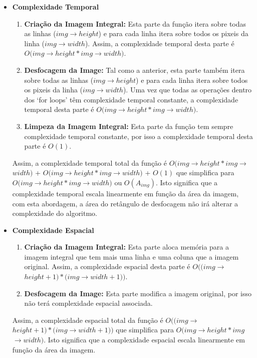 \begin{itemize}
    
\item
\textbf{Complexidade Temporal}

\begin{enumerate}
    \item \textbf{Criação da Imagem Integral:} Esta parte da função itera sobre todas as linhas ($img$$\rightarrow$$height$) e para cada linha itera sobre todos os pixeis da linha ($img$$\rightarrow$$width$). Assim, a complexidade temporal desta parte é $O(img$$\rightarrow$$height * img$$\rightarrow$$width)$.
    \item \textbf{Desfocagem da Image:} Tal como a anterior, esta parte também itera sobre todas as linhas ($img$$\rightarrow$$height$) e para cada linha itera sobre todos os pixeis da linha ($img$$\rightarrow$$width$). Uma vez que todas as operações dentro dos `for loops' têm complexidade temporal constante, a complexidade temporal desta parte é $O(img$$\rightarrow$$height * img$$\rightarrow$$width)$.
    \item \textbf{Limpeza da Imagem Integral:} Esta parte da função tem sempre complexidade temporal constante, por isso a complexidade temporal desta parte é $O(1)$.
\end{enumerate}

Assim, a complexidade temporal total da função é $O(img$$\rightarrow$$height * img$$\rightarrow$$width)$ + $O(img$$\rightarrow$$height * img$$\rightarrow$$width)$ + $O(1)$ que simplifica para $O(img$$\rightarrow$$height * img$$\rightarrow$$width)$ ou $O(A_{img})$. Isto significa que a complexidade temporal escala linearmente em função da área da imagem, com esta abordagem, a área do retângulo de desfocagem não irá alterar a complexidade do algoritmo.

\item
\textbf{Complexidade Espacial}

\begin{enumerate}
    \item \textbf{Criação da Imagem Integral:} Esta parte aloca memória para a imagem integral que tem mais uma linha e uma coluna que a imagem original. Assim, a complexidade espacial desta parte é $O((img$$\rightarrow$$height + 1) * (img$$\rightarrow$$width + 1))$.
    \item \textbf{Desfocagem da Image:} Esta parte modifica a imagem original, por isso não terá complexidade espacial associada.
\end{enumerate}

Assim, a complexidade espacial total da função é $O((img$$\rightarrow$$height + 1) * (img$$\rightarrow$$width + 1))$ que simplifica para $O(img$$\rightarrow$$height * img$$\rightarrow$$width)$. Isto significa que a complexidade espacial escala linearmente em função da área da imagem.

\end{itemize}
